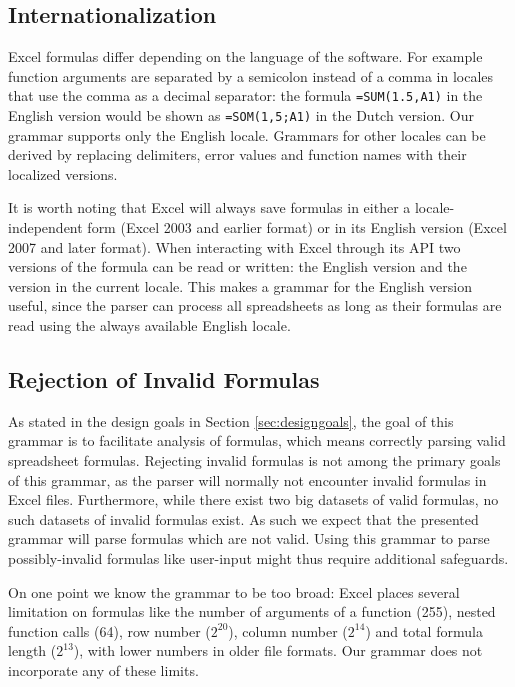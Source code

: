 \documentclass[conference]{IEEEtran}
\begin{document}
\subsection{Internationalization}

Excel formulas differ depending on the language of the software. For example function arguments are separated by a semicolon instead of a comma in locales that use the comma as a decimal separator: the formula \texttt{=SUM(1.5,A1)} in the English version would be shown as \texttt{=SOM(1,5;A1)} in the Dutch version.
Our grammar supports only the English locale.
Grammars for other locales can be derived by replacing delimiters, error values and function names with their localized versions.

It is worth noting that Excel will always save formulas in either a locale-independent form (Excel 2003 and earlier format) or in its English version (Excel 2007 and later format). When interacting with Excel through its API two versions of the formula can be read or written: the English version and the version in the current locale.
This makes a grammar for the English version useful, since the parser can process all spreadsheets as long as their formulas are read using the always available English locale.

\subsection{Rejection of Invalid Formulas}

As stated in the design goals in Section \ref{sec:designgoals}, the goal of this grammar is to facilitate analysis of formulas, which means correctly parsing valid spreadsheet formulas.
Rejecting invalid formulas is not among the primary goals of this grammar, as the parser will normally not encounter invalid formulas in Excel files.
Furthermore, while there exist two big datasets of valid formulas, no such datasets of invalid formulas exist.
As such we expect that the presented grammar will parse formulas which are not valid.
Using this grammar to parse possibly-invalid formulas like user-input might thus require additional safeguards.

On one point we know the grammar to be too broad: Excel places several limitation on formulas like the number of arguments of a function (255), nested function calls (64), row number ($2^{20}$), column number ($2^{14}$) and total formula length ($2^{13}$), with lower numbers in older file formats.
Our grammar does not incorporate any of these limits.
\end{document}
